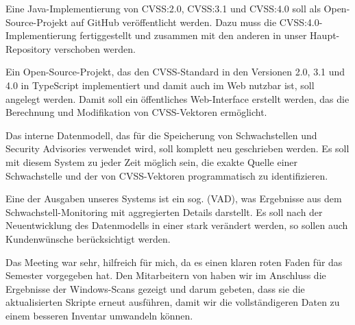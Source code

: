 \begin{smitemize}
    \item Eine Java-Implementierung von CVSS:2.0, CVSS:3.1 und CVSS:4.0 soll als Open-Source-Projekt auf GitHub veröffentlicht werden.
    Dazu muss die CVSS:4.0-Implementierung fertiggestellt und zusammen mit den anderen in unser Haupt-Repository verschoben werden.
    \item Ein Open-Source-Projekt, das den CVSS-Standard in den Versionen 2.0, 3.1 und 4.0 in TypeScript implementiert und damit auch im Web nutzbar ist, soll angelegt werden.
    Damit soll ein öffentliches Web-Interface erstellt werden, das die Berechnung und Modifikation von CVSS-Vektoren ermöglicht.
    \item Das interne Datenmodell, das für die Speicherung von Schwachstellen und Security Advisories verwendet wird, soll komplett neu geschrieben werden.
    Es soll mit diesem System zu jeder Zeit möglich sein, die exakte Quelle einer Schwachstelle und der von CVSS-Vektoren programmatisch zu identifizieren.
    \item Eine der Ausgaben unseres Systems ist ein sog.  (VAD), was Ergebnisse aus dem Schwachstell-Monitoring mit aggregierten Details darstellt.
    Es soll nach der Neuentwicklung des Datenmodells in einer  stark verändert werden, so sollen auch Kundenwünsche berücksichtigt werden.
\end{smitemize}

Das Meeting war sehr, hilfreich für mich, da es einen klaren roten Faden für das Semester vorgegeben hat.
Den Mitarbeitern von {\aeclientZEZESE} haben wir im Anschluss die Ergebnisse der Windows-Scans gezeigt und darum gebeten, dass sie die aktualisierten Skripte erneut ausführen, damit wir die vollständigeren Daten zu einem besseren Inventar umwandeln können.
